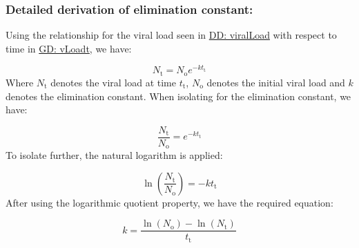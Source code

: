 \documentclass[12pt]{article}
\begin{document}
\subsubsection*{Detailed derivation of elimination constant:}
\label{IM:calofElimConstDeriv}
Using the relationship for the viral load seen in \hyperref[DD_viralload]{DD: 
viralLoad} with respect to time in \hyperref[GD_vLoadt]{GD: vLoadt}, we have:

\begin{displaymath}
{N_{\text{t}}}={N_{\text{o}}} e^{-k {t_{\text{t}}}}
\end{displaymath}
Where ${N_{\text{t}}}$ denotes the viral load at time $t_{\text{t}}$, ${N_{\text{o}}}$ 
denotes the initial viral load and $k$ denotes the elimination constant. When 
isolating for the elimination constant,  we have:

\begin{displaymath}
\frac{{N_{\text{t}}}}{{N_{\text{o}}}}=e^{-k {t_{\text{t}}}}
\end{displaymath}
To isolate further, the natural logarithm is applied:

\begin{displaymath}
\ln\left(\frac{{N_{\text{t}}}}{{N_{\text{o}}}}\right)=-k {t_{\text{t}}}
\end{displaymath}
After using the logarithmic quotient property, we have the required equation:

\begin{displaymath}
k=\frac{\ln\left({N_{\text{o}}}\right)-\ln\left({N_{\text{t}}}\right)}{{t_{\text{t}}}}
\end{displaymath}

  
~\newline
\end{document}
